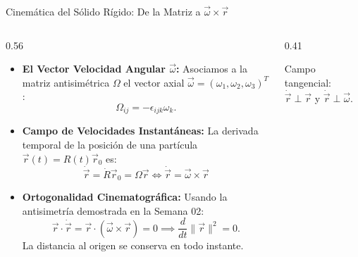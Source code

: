\documentclass[10pt,aspectratio=169]{beamer}
\begin{document}
\begin{frame}{Cinemática del Sólido Rígido: De la Matriz a $\vec{\omega}\times\vec{r}$}
  \begin{columns}[c]
    \begin{column}{0.56\textwidth}
      \footnotesize
      \begin{itemize}\itemsep2pt
        \item \textbf{El Vector Velocidad Angular $\vec{\omega}$:}
        Asociamos a la matriz antisimétrica $\Omega$ el vector axial $\vec{\omega} = (\omega_1, \omega_2, \omega_3)^T$:
        \[
        \Omega_{ij} = -\epsilon_{ijk}\omega_k.
        \]
        \item \textbf{Campo de Velocidades Instantáneas:}
        La derivada temporal de la posición de una partícula $\vec{r}(t) = R(t)\vec{r}_0$ es:
        \[
        \dot{\vec{r}} = \dot{R}\vec{r}_0 = \Omega\vec{r} \iff \boxed{\dot{\vec{r}} = \vec{\omega} \times \vec{r}}
        \]
        \item \textbf{Ortogonalidad Cinematográfica:}
        Usando la antisimetría demostrada en la Semana 02:
        \[
        \vec{r}\cdot\dot{\vec{r}} = \vec{r}\cdot(\vec{\omega}\times\vec{r}) = 0 \implies \frac{d}{dt}\|\vec{r}\|^2 = 0.
        \]
        La distancia al origen se conserva en todo instante.
      \end{itemize}
    \end{column}
    \begin{column}{0.41\textwidth}
      \centering
      \vspace{0.1cm}
      {\scriptsize Campo tangencial: $\dot{\vec{r}} \perp \vec{r}$ y $\dot{\vec{r}} \perp \vec{\omega}$.}
    \end{column}
  \end{columns}
\end{frame}
\end{document}
